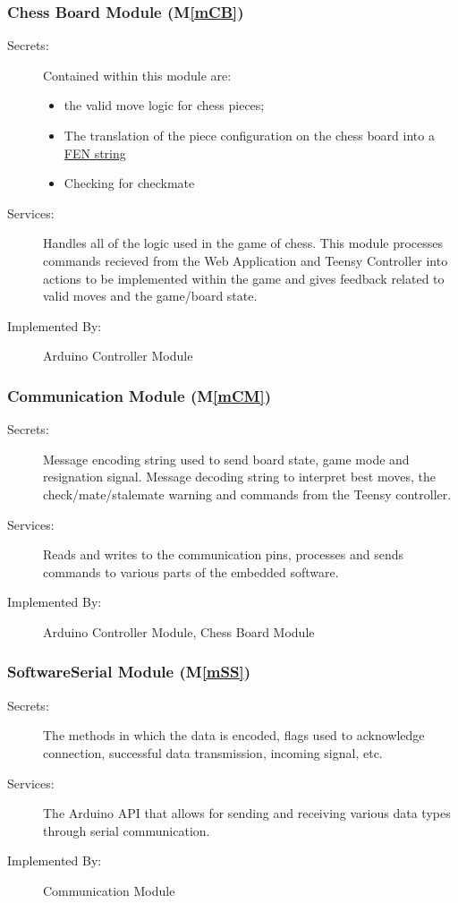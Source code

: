 \documentclass[12pt, titlepage]{article}
\newcommand{\mref}[1]{M\ref{#1}}
\begin{document}
\subsubsection{Chess Board Module (\mref{mCB})}
\begin{description}
\item[Secrets:] Contained within this module are: 
  \begin{itemize}
    \item the valid move logic for chess pieces; 
    \item The translation of the piece configuration on the chess board into a \href{https://en.wikipedia.org/wiki/Forsyth%E2%80%93Edwards_Notation}{FEN string} \item Checking for checkmate
  \end{itemize}
\item[Services:] Handles all of the logic used in the game of chess. This module processes commands recieved from the Web Application and Teensy Controller into actions to be implemented within the game and gives feedback related to valid moves and the game/board state.
\item[Implemented By:] Arduino Controller Module
\end{description}

\subsubsection{Communication Module (\mref{mCM})}
\begin{description}
\item[Secrets:] Message encoding string used to send board state, game mode and resignation signal. Message decoding string to interpret best moves, the check/mate/stalemate warning and commands from the Teensy controller.
\item[Services:] Reads and writes to the communication pins, processes and sends commands to various parts of the embedded software.
\item[Implemented By:] Arduino Controller Module, Chess Board Module
\end{description}

\subsubsection{SoftwareSerial Module (\mref{mSS})}
\begin{description}
\item[Secrets:] The methods in which the data is encoded, flags used to acknowledge connection, successful data transmission, incoming signal, etc.
\item[Services:] The Arduino API that allows for sending and receiving various data types through serial communication.
\item[Implemented By:] Communication Module
\end{description}
\end{document}
